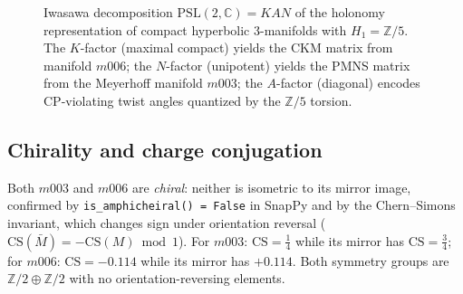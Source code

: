 ﻿\documentclass[12pt]{article}
\theoremstyle{definition}
\begin{document}
\begin{figure}[htbp]
\centering
{}
\caption{Iwasawa decomposition $\mathrm{PSL}(2,\mathbb{C})=KAN$ of the
holonomy representation of compact hyperbolic 3-manifolds with
$H_1=\mathbb{Z}/5$. The $K$-factor (maximal compact) yields the CKM
matrix from manifold $m006$; the $N$-factor (unipotent) yields the
PMNS matrix from the Meyerhoff manifold $m003$; the $A$-factor
(diagonal) encodes CP-violating twist angles quantized by the
$\mathbb{Z}/5$ torsion.}
\label{fig:kan}
\end{figure}


\subsection{Chirality and charge conjugation}
\label{subsec:chirality}

Both $m003$ and $m006$ are \emph{chiral}: neither is isometric to
its mirror image, confirmed by \texttt{is\_amphicheiral() = False} in
SnapPy and by the Chern--Simons invariant, which changes sign under
orientation reversal ($\mathrm{CS}(\bar{M}) = -\mathrm{CS}(M)
\bmod 1$). For $m003$: $\mathrm{CS} = \tfrac{1}{4}$ while its mirror
has $\mathrm{CS} = \tfrac{3}{4}$; for $m006$: $\mathrm{CS} = -0.114$
while its mirror has $+0.114$. Both symmetry groups are
$\mathbb{Z}/2\oplus\mathbb{Z}/2$ with no orientation-reversing
elements.
\end{document}
